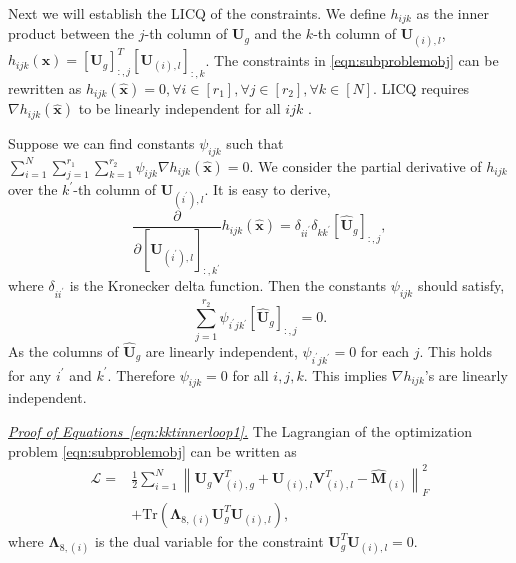 \documentclass[twoside,11pt]{article}
\newcommand{\norm}[1]{\left\lVert#1\right\rVert}
\newcommand{\tr}[1]{\text{Tr}\left(#1\right)}
\newcommand{\matLambda}{\mathbf{\Lambda}}
\newcommand{\matU}{\mathbf{U}}
\newcommand{\matV}{\mathbf{V}}
\newcommand{\hmatM}{\hat{\mathbf{M}}}
\newcommand{\hmatU}{\hat{\mathbf{U}}}
\newcommand{\vecx}{\mathbf{x}}
\begin{document}
Next we will establish the LICQ of the constraints. We define $h_{ijk}$ as the inner product between the $j$-th column of $\matU_g$ and the $k$-th column of $\matU_{(i),l}$, $ h_{ijk}(\vecx)=[\matU_g]_{:,j}^T[\matU_{(i),l}]_{:,k}$. The constraints in \eqref{eqn:subproblemobj} can be rewritten as $h_{ijk}(\hat{\vecx})=0,\forall i\in[r_1],\forall j\in[r_2],\forall k\in [N]$. LICQ requires $\nabla h_{ijk}(\hat{\vecx})$ to be linearly independent for all $ijk$ \cite[Proposition 3.1.1]{nonlinearprogramming}. 

Suppose  we can find constants $\psi_{ijk}$ such that $\sum_{i=1}^{N}\sum_{j=1}^{r_1}\sum_{k=1}^{r_2}\psi_{ijk}\nabla h_{ijk}(\hat{\vecx})=0$. We consider the partial derivative of $h_{ijk}$ over the $k^{'}$-th column of $\matU_{(i^{'}),l}$. It is easy to derive,
$$
\frac{\partial}{\partial [\matU_{(i^{'}),l}]_{:,k^{'}}}h_{ijk}(\hat{\vecx})= \delta_{ii^{'}}\delta_{kk^{'}}[\hmatU_g]_{:,j},
$$
where $\delta_{ii^{'}}$ is the Kronecker delta function. Then the constants $\psi_{ijk}$ should satisfy,
$$
\sum_{j=1}^{r_2}\psi_{i^{'}jk^{'}}[\hmatU_g]_{:,j}=0.
$$
As the columns of $\hmatU_g$ are linearly independent, $\psi_{i^{'}jk^{'}}=0$ for each $j$. This holds for any $i^{'}$ and $k^{'}$. Therefore $\psi_{ijk}=0$ for all $i,j,k$.  This implies $\nabla h_{ijk}$'s are linearly independent.


\noindent \underline{\it Proof of Equations~\eqref{eqn:kktinnerloop1}.} The Lagrangian of the optimization problem \eqref{eqn:subproblemobj} can be written as
\begin{equation}
\label{eqn:lagrangian}
\begin{aligned}
\mathcal{L} =& \frac{1}{2}\sum_{i=1}^N\norm{\matU_g\matV_{(i),g}^T+\matU_{(i),l}\matV_{(i),l}^T-\hmatM_{(i)}}_F^2\\
&+\tr{\matLambda_{8,(i)}\matU_g^T\matU_{(i),l}} ,   
\end{aligned}
\end{equation}
where $\matLambda_{8,(i)}$ is the dual variable for the constraint $\matU_g^T\matU_{(i),l}=0$.
\end{document}
